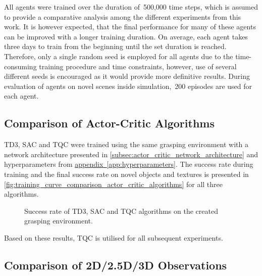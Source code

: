 All agents were trained over the duration of~500,000 time steps, which is assumed to provide a comparative analysis among the different experiments from this work. It is however expected, that the final performance for many of these agents can be improved with a longer training duration. On average, each agent takes three days to train from the beginning until the set duration is reached. Therefore, only a single random seed is employed for all agents due to the time-consuming training procedure and time constraints, however, use of several different seeds is encouraged as it would provide more definitive results. During evaluation of agents on novel scenes inside simulation,~200 episodes are used for each agent.


\subsection{Comparison of Actor-Critic Algorithms}

TD3, SAC and TQC were trained using the same grasping environment with a network architecture presented in \autoref{subsec:actor_critic_network_architecture} and hyperparameters from \hyperref[app:hyperparameters]{appendix~\ref*{app:hyperparameters}}. The success rate during training and the final success rate on novel objects and textures is presented in \autoref{fig:training_curve_comparison_actor_critic_algorithms} for all three algorithms.

\begin{figure}[ht]
    \centering
    \caption{Success rate of TD3, SAC and TQC algorithms on the created grasping environment.}
    \label{fig:training_curve_comparison_actor_critic_algorithms}
\end{figure}

Based on these results, TQC is utilised for all subsequent experiments.


\subsection{Comparison of 2D/2.5D/3D Observations}\label{subsec:comparison_of_2d_2_5d_3d_observations}

